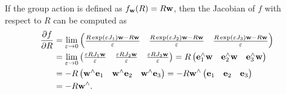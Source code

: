 If the group action is defined as $f_{\mathbf{w}}(R) = R\mathbf{w}$, then the Jacobian of $f$ with respect to $R$ can be computed as
\begin{align*}
\frac{\partial f}{\partial R} &= \lim_{\varepsilon \to 0} \begin{pmatrix} 
 	\frac{R\exp(\varepsilon J_1)\mathbf{w} - R\mathbf{w}}{\varepsilon} & 
 	\frac{R\exp(\varepsilon J_2)\mathbf{w} - R\mathbf{w}}{\varepsilon} &
 	\frac{R\exp(\varepsilon J_3)\mathbf{w} - R\mathbf{w}}{\varepsilon}
 \end{pmatrix} \\
 &= \lim_{\varepsilon \to 0} \begin{pmatrix} 
 	\frac{\varepsilon RJ_1\mathbf{w}}{\varepsilon} & 
 	\frac{\varepsilon RJ_2\mathbf{w}}{\varepsilon} &
 	\frac{\varepsilon RJ_3\mathbf{w}}{\varepsilon}
 \end{pmatrix}
  = R\begin{pmatrix} 
 	\mathbf{e}_1^\wedge\mathbf{w} & 
 	\mathbf{e}_2^\wedge\mathbf{w} & 
 	\mathbf{e}_3^\wedge\mathbf{w} 
 \end{pmatrix} \\
 &= -R\begin{pmatrix} 
 	\mathbf{w}^\wedge\mathbf{e}_1 & 
 	\mathbf{w}^\wedge\mathbf{e}_2 & 
 	\mathbf{w}^\wedge\mathbf{e}_3 
 \end{pmatrix} 
  = -R\mathbf{w}^\wedge \begin{pmatrix} 
 	\mathbf{e}_1 & 
 	\mathbf{e}_2 & 
 	\mathbf{e}_3 
 \end{pmatrix}\\
   &= -R\mathbf{w}^\wedge.
\end{align*}



